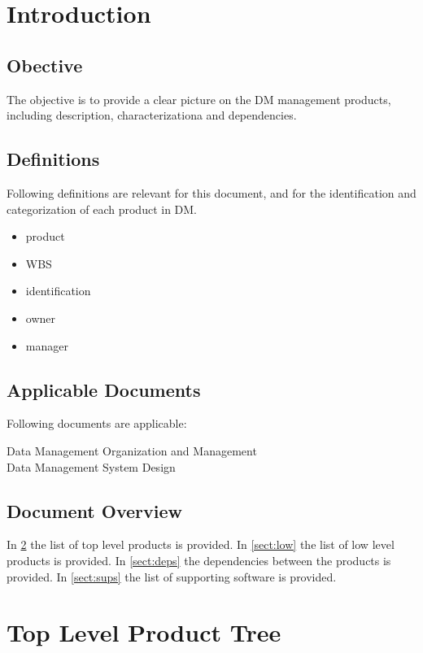 \section{Introduction}

\subsection{Obective}

The objective is to provide a clear picture on the DM management products, including description, characterizationa and dependencies.

\subsection{Definitions}

Following definitions are relevant for this document, and for the identification and categorization of each product in DM.

\begin{itemize}
\item product
\item WBS
\item identification
\item owner
\item manager
\end{itemize}

\subsection{Applicable Documents}

Following documents are applicable:

 Data Management Organization and Management\\
 Data Management System Design

\subsection{Document Overview}

In \ref{sect:top} the list of top level products is provided.
In \ref{sect:low} the list of low level products is provided.
In \ref{sect:deps} the dependencies between the products is provided.
In \ref{sect:sups} the list of supporting software is provided.

\newpage
\section{Top Level Product Tree}\label{sect:top}


